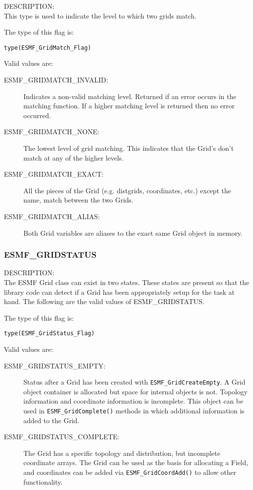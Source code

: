 {\sf DESCRIPTION:\\}
 This type is used to indicate the level to which two grids match.

The type of this flag is:

{\tt type(ESMF\_GridMatch\_Flag)}

Valid values are:
\begin{description}
\item [ESMF\_GRIDMATCH\_INVALID:] Indicates a non-valid matching level. Returned
      if an error occurs in the matching function. If a higher matching level
      is returned then no error occurred.
\item [ESMF\_GRIDMATCH\_NONE:] The lowest level of grid matching. 
      This indicates that the Grid's don't match at any of the higher levels. 
\item [ESMF\_GRIDMATCH\_EXACT:] All the pieces of the Grid (e.g. distgrids, 
      coordinates, etc.) except the name, match between the two Grids. 
\item [ESMF\_GRIDMATCH\_ALIAS:] Both Grid variables are aliases to the exact
      same Grid object in memory. 
\end{description}



\subsubsection{ESMF\_GRIDSTATUS}
\label{sec:opt:gridstatus}

{\sf DESCRIPTION:\\}
The ESMF Grid class can exist in two states. These states are
present so that the library code can detect if a Grid has been
appropriately setup for the task at hand. The following
are the valid values of ESMF\_GRIDSTATUS.

The type of this flag is:

{\tt type(ESMF\_GridStatus\_Flag)}

Valid values are:
\begin{description}
\item [ESMF\_GRIDSTATUS\_EMPTY:] Status after a Grid has been created with 
      {\tt ESMF\_GridCreateEmpty}.  A Grid object container is allocated but
      space for internal objects is not.  Topology information and coordinate
      information is incomplete.  This object can be used in {\tt ESMF\_GridComplete()}
      methods in which additional information is added to the Grid.
\item [ESMF\_GRIDSTATUS\_COMPLETE:] The Grid has a specific topology and
      distribution, but incomplete coordinate arrays.  The Grid can be used
      as the basis for allocating a Field, and coordinates can be added
      via {\tt ESMF\_GridCoordAdd()} to allow other functionality. 
\end{description}



